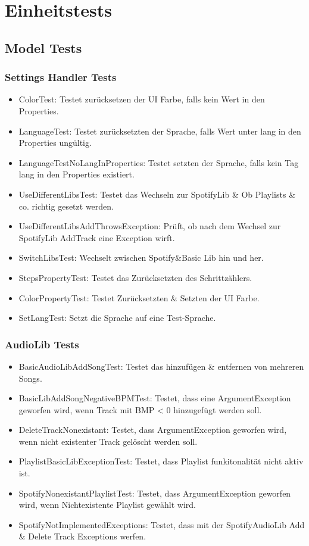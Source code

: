 \documentclass[../validierung.tex]{subfiles}
\begin{document}
	\section{Einheitstests}
		\subsection{Model Tests}
			\subsubsection{Settings Handler Tests}
				\begin{itemize}
					\item ColorTest: Testet zurücksetzen der UI Farbe, falls kein Wert in den Properties.
					\item LanguageTest: Testet zurücksetzten der Sprache, falls Wert unter lang in den Properties ungültig.
					\item LanguageTestNoLangInProperties: Testet setzten der Sprache, falls kein Tag lang in den Properties existiert.
					\item UseDifferentLibsTest: Testet das Wechseln zur SpotifyLib \& Ob Playlists \& co. richtig gesetzt werden.
					\item UseDifferentLibsAddThrowsException: Prüft, ob nach dem Wechsel zur SpotifyLib AddTrack eine Exception wirft.
					\item SwitchLibsTest: Wechselt zwischen Spotify{\&}Basic Lib hin und her.
					\item StepsPropertyTest: Testet das Zurücksetzten des Schrittzählers.
					\item ColorPropertyTest: Testet Zurücksetzten \& Setzten der UI Farbe.
					\item SetLangTest: Setzt die Sprache auf eine Test-Sprache.
				\end{itemize}
			\subsubsection{AudioLib Tests}
				\begin{itemize}
					\item BasicAudioLibAddSongTest: Testet das hinzufügen \& entfernen von mehreren Songs.
					\item BasicLibAddSongNegativeBPMTest: Testet, dass eine ArgumentException geworfen wird, wenn Track mit BMP < 0 hinzugefügt werden 
					soll.
					\item DeleteTrackNonexistant: Testet, dass ArgumentException geworfen wird, wenn nicht existenter Track gelöscht werden soll.
					\item PlaylistBasicLibExceptionTest: Testet, dass Playlist funkitonalität nicht aktiv ist.
					\item SpotifyNonexistantPlaylistTest: Testet, dass ArgumentException geworfen wird, wenn Nichtexistente Playlist gewählt wird.
					\item SpotifyNotImplementedExceptions: Testet, dass mit der SpotifyAudioLib Add \& Delete Track Exceptions werfen.
				\end{itemize}
\end{document}
